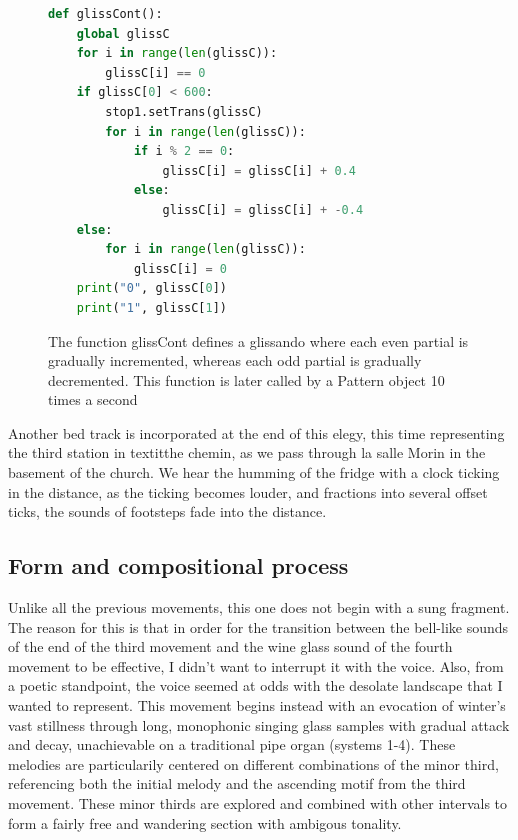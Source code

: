 \documentclass[12pt,twoside,maitrise]{dms_ks}
\theoremstyle{definition}
\begin{document}
\begin{figure}[H]
\begin{lstlisting}[language=Python]
def glissCont():
    global glissC
    for i in range(len(glissC)):
        glissC[i] == 0
    if glissC[0] < 600:
        stop1.setTrans(glissC)
        for i in range(len(glissC)):
            if i % 2 == 0:
                glissC[i] = glissC[i] + 0.4
            else:
                glissC[i] = glissC[i] + -0.4
    else:
        for i in range(len(glissC)):
            glissC[i] = 0
    print("0", glissC[0])
    print("1", glissC[1])
\end{lstlisting}
\caption{The function glissCont defines a glissando where each even partial is gradually incremented, whereas each odd partial is gradually decremented. This function is later called by a Pattern object 10 times a second}
\end{figure}

Another bed track is incorporated at the end of this elegy, this time representing the third station in textit{the chemin}, as we pass through la salle Morin in the basement of the church. We hear the humming of the fridge with a clock ticking in the distance, as the ticking becomes louder, and fractions into several offset ticks, the sounds of footsteps fade into the distance.

\subsection{Form and compositional process}

Unlike all the previous movements, this one does not begin with a sung fragment. The reason for this is that in order for the transition between the bell-like sounds of the end of the third movement and the wine glass sound of the fourth movement to be effective, I didn't want to interrupt it with the voice. Also, from a poetic standpoint, the voice seemed at odds with the desolate landscape that I wanted to represent.
This movement begins instead with an evocation of winter's vast stillness through long, monophonic singing glass samples with gradual attack and decay, unachievable on a traditional pipe organ (systems 1-4).
These melodies are particularily centered on different combinations of the minor third, referencing both the initial melody and the ascending motif from the third movement.
These minor thirds are explored and combined with other intervals to form a fairly free and wandering section with ambigous tonality.

\end{document}
